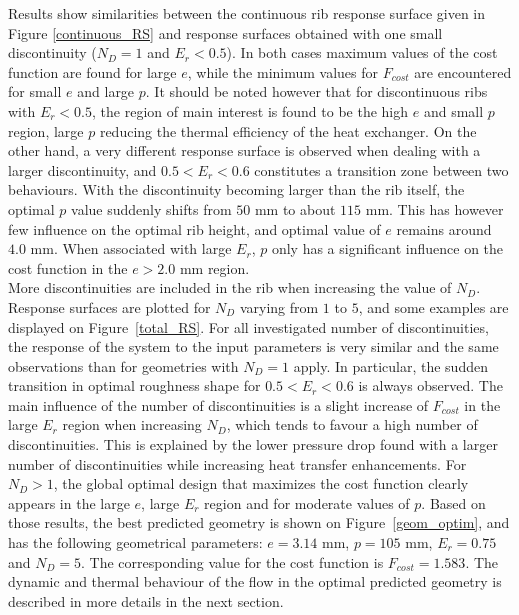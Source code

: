 Results show similarities between the continuous rib response surface given in Figure \ref{continuous_RS} and response surfaces obtained with one small discontinuity ($N_D=1$ and $E_r < 0.5$). In both cases maximum values of the cost function are found for large $e$, while the minimum values for $F_{cost}$ are encountered for small $e$ and large $p$. It should be noted however that for discontinuous ribs with $E_r < 0.5$, the region of main interest is found to be the high $e$ and small $p$ region, large $p$ reducing the thermal efficiency of the heat exchanger. On the other hand, a very different response surface is observed when dealing with a larger discontinuity, and $0.5 < E_r < 0.6$ constitutes a transition zone between two behaviours. With the discontinuity becoming larger than the rib itself, the optimal $p$ value suddenly shifts from $50$ mm to about $115$ mm. This has however few influence on the optimal rib height, and optimal value of $e$ remains around $4.0$ mm. When associated with large $E_r$, $p$ only has a significant influence on the cost function in the $e > 2.0$ mm region.\\

More discontinuities are included in the rib when increasing the value of $N_D$. Response surfaces are plotted for $N_D$ varying from $1$ to $5$, and some examples are displayed on Figure~\ref{total_RS}. For all investigated number of discontinuities, the response of the system to the input parameters is very similar and the same observations than for geometries with $N_D=1$ apply. In particular, the sudden transition in optimal roughness shape for $0.5 < E_r < 0.6$ is always observed. The main influence of the number of discontinuities is a slight increase of $F_{cost}$ in the large $E_r$ region when increasing $N_D$, which tends to favour a high number of discontinuities. This is explained by the lower pressure drop found with a larger number of discontinuities while increasing heat transfer enhancements. For $N_D > 1$, the global optimal design that maximizes the cost function clearly appears in the large $e$, large $E_r$ region and for moderate values of $p$. Based on those results, the best predicted geometry is shown on Figure~\ref{geom_optim}, and has the following geometrical parameters: $e=3.14$ mm, $p=105$ mm, $E_r=0.75$ and $N_D=5$. The corresponding value for the cost function is $F_{cost}=1.583$. The dynamic and thermal behaviour of the flow in the optimal predicted geometry is described in more details in the next section.\\

